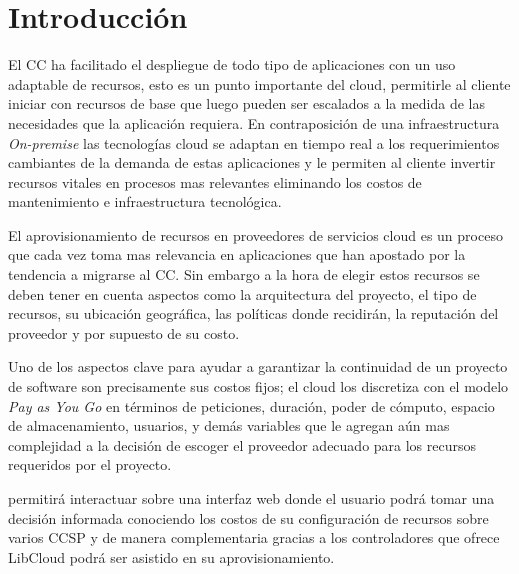 \chapter{Introducción} %

\label{ch:introduccion} %



El \acrlong{CC} ha facilitado el despliegue de todo tipo de aplicaciones con un uso adaptable de recursos, esto es un punto importante del cloud, permitirle al cliente iniciar con recursos de base que luego pueden ser escalados a la medida de las necesidades que la aplicación requiera. En contraposición de una infraestructura \emph{On-premise} las tecnologías cloud se adaptan en tiempo real a los requerimientos cambiantes de la demanda de estas aplicaciones y le permiten al cliente invertir recursos vitales en procesos mas relevantes eliminando los costos de mantenimiento e infraestructura tecnológica.\bigskip

El aprovisionamiento de recursos en proveedores de servicios cloud es un proceso que cada vez toma mas relevancia en aplicaciones que han apostado por la tendencia a migrarse al \acrshort{CC}. Sin embargo a la hora de elegir estos recursos se deben tener en cuenta aspectos como la arquitectura del proyecto, el tipo de recursos, su ubicación geográfica, las políticas donde recidirán, la reputación del proveedor y por supuesto de su costo.\bigskip

Uno de los aspectos clave para ayudar a garantizar la continuidad de un proyecto de software son precisamente sus costos fijos; el cloud los discretiza con el modelo \emph{Pay as You Go} en términos de peticiones, duración, poder de cómputo, espacio de almacenamiento, usuarios, y demás variables que le agregan aún mas complejidad a la decisión de escoger el proveedor adecuado para los recursos requeridos por el proyecto. \bigskip

\appName permitirá interactuar sobre una interfaz web donde el usuario podrá tomar una decisión informada conociendo los costos de su configuración de recursos sobre varios \acrshort{CCSP} y de manera complementaria gracias a los controladores que ofrece \gls{LibCloud} podrá ser asistido en su aprovisionamiento.\bigskip